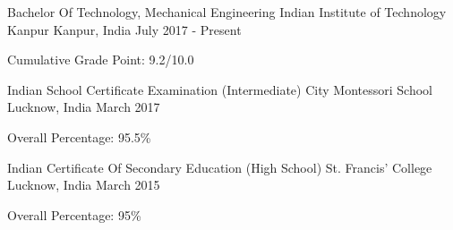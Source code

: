
\begin{cventries}

  \cventry
    {Bachelor Of Technology, Mechanical Engineering}
    {Indian Institute of Technology Kanpur}
    {Kanpur, India}
    {July 2017 - Present}
    {
      \begin{cvitems}
        \item {Cumulative Grade Point: 9.2/10.0}
      \end{cvitems}
    }

  \cventry
    {Indian School Certificate Examination (Intermediate)}
    {City Montessori School}
    {Lucknow, India}
    {March 2017}
    {
      \begin{cvitems}
        \item {Overall Percentage: 95.5\%}
      \end{cvitems}
    }

  \cventry
    {Indian Certificate Of Secondary Education (High School)}
    {St. Francis' College}
    {Lucknow, India}
    {March 2015}
    {
      \begin{cvitems}
        \item {Overall Percentage: 95\%}
      \end{cvitems}
    }


  
\end{cventries}

